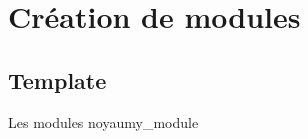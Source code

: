 %
\section{Création de modules}

\subsection{Template}

\begin{frame}[fragile=singleslide]{Les modules noyau}{my\_module}
  
\end{frame}

